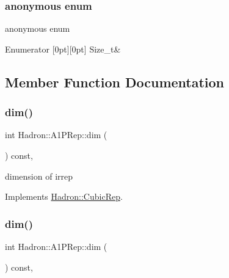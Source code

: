 \subsubsection{\texorpdfstring{anonymous enum}{anonymous enum}}
{\footnotesize\ttfamily anonymous enum}

\begin{DoxyEnumFields}{Enumerator}
[0pt][0pt]{}\mbox{\label{structHadron_1_1A1PRep_a17f6d89444f8726a16c3ebc23f16092ba818391020c14366c5159f7b053a876fa}} 
Size\+\_\+t&\\
\hline

\end{DoxyEnumFields}


\subsection{Member Function Documentation}
\mbox{\label{structHadron_1_1A1PRep_a76603c4dc897bd41f2a01f55b209391b}} 
\subsubsection{\texorpdfstring{dim()}{dim()}\hspace{0.1cm}{\footnotesize\ttfamily [1/2]}}
{\footnotesize\ttfamily int Hadron\+::\+A1\+P\+Rep\+::dim (\begin{DoxyParamCaption}{ }\end{DoxyParamCaption}) const\hspace{0.3cm}{\ttfamily [inline]}, {\ttfamily [virtual]}}

dimension of irrep 

Implements \mbox{\hyperlink{structHadron_1_1CubicRep_ac178d14064f037a66af4b9fb4b312d51}{Hadron\+::\+Cubic\+Rep}}.

\mbox{\label{structHadron_1_1A1PRep_a76603c4dc897bd41f2a01f55b209391b}} 
\subsubsection{\texorpdfstring{dim()}{dim()}\hspace{0.1cm}{\footnotesize\ttfamily [2/2]}}
{\footnotesize\ttfamily int Hadron\+::\+A1\+P\+Rep\+::dim (\begin{DoxyParamCaption}{ }\end{DoxyParamCaption}) const\hspace{0.3cm}{\ttfamily [inline]}, {\ttfamily [virtual]}}

